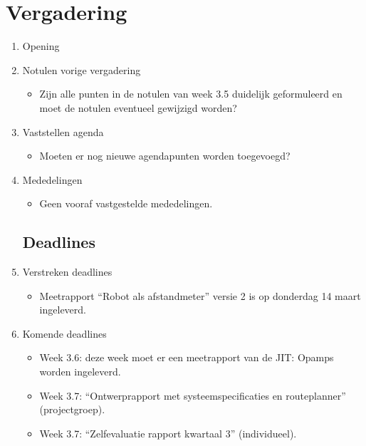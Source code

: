 \documentclass{article}
\begin{document}
\section*{Vergadering}
\begin{enumerate}
	
\subsection*{Vooraf}
\item Opening
\item Notulen vorige vergadering

\begin{itemize}
	\item Zijn alle punten in de notulen van week 3.5 duidelijk geformuleerd en moet de notulen eventueel gewijzigd worden?
\end{itemize}

\item Vaststellen agenda

\begin{itemize}
	\item Moeten er nog nieuwe agendapunten worden toegevoegd?
\end{itemize}

\item Mededelingen
\begin{itemize}
	\item Geen vooraf vastgestelde mededelingen.
\end{itemize}

\subsection*{Deadlines}
	\item Verstreken deadlines
\begin{itemize}
	\item Meetrapport ``Robot als afstandmeter'' versie 2 is op donderdag 14 maart ingeleverd.
\end{itemize}
	\item Komende deadlines
\begin{itemize}
	\item Week 3.6: deze week moet er een meetrapport van de JIT: Opamps worden ingeleverd. 
	\item Week 3.7: ``Ontwerprapport met systeemspecificaties en routeplanner'' (projectgroep).
	\item Week 3.7: ``Zelfevaluatie rapport kwartaal 3'' (individueel).
\end{itemize}


\end{enumerate}
\end{document}
